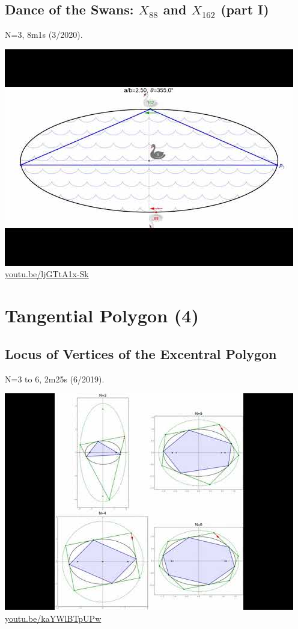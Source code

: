 \documentclass[12pt]{amsart}
\begin{document}
\subsection{Dance of the Swans: $X_{88}$ and $X_{162}$ (part I)}
\label{vid:ljGTtA1x-Sk}
\noindent N=3, 8m1s (3/2020). 
\begin{center}\includegraphics[width=.5\textwidth]{pics/ljGTtA1x-Sk.jpg} \\ 
\href{https://youtu.be/ljGTtA1x-Sk}{\url{youtu.be/ljGTtA1x-Sk}}\end{center}
% 


\section{Tangential Polygon (4)}

\subsection{Locus of Vertices of the Excentral Polygon}
\label{vid:kaYWlBTpUPw}
\noindent N=3 to 6, 2m25s (6/2019). 
\begin{center}\includegraphics[width=.5\textwidth]{pics/kaYWlBTpUPw.jpg} \\ 
\href{https://youtu.be/kaYWlBTpUPw}{\url{youtu.be/kaYWlBTpUPw}}\end{center}
% 
\end{document}
